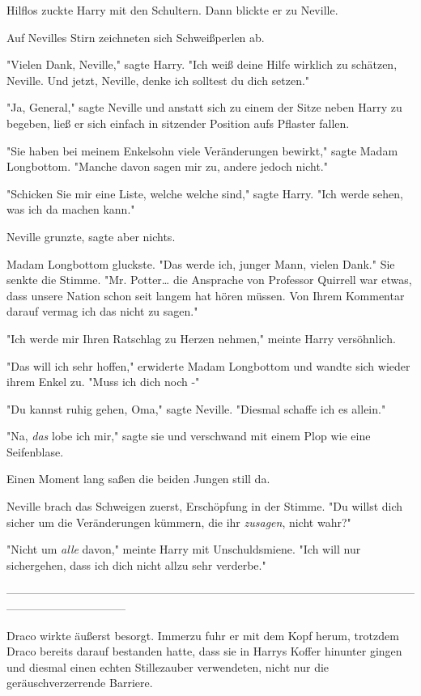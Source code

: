 {Hilflos zuckte Harry mit den Schultern. Dann blickte er zu Neville.

Auf Nevilles Stirn zeichneten sich Schweißperlen ab.

"Vielen Dank, Neville," sagte Harry. "Ich weiß deine Hilfe wirklich zu schätzen, Neville. Und jetzt, Neville, denke ich solltest du dich setzen."

"Ja, General," sagte Neville und anstatt sich zu einem der Sitze neben Harry zu begeben, ließ er sich einfach in sitzender Position aufs Pflaster fallen.

"Sie haben bei meinem Enkelsohn viele Veränderungen bewirkt," sagte Madam Longbottom. "Manche davon sagen mir zu, andere jedoch nicht."

"Schicken Sie mir eine Liste, welche welche sind," sagte Harry. "Ich werde sehen, was ich da machen kann."

Neville grunzte, sagte aber nichts.

Madam Longbottom gluckste. "Das werde ich, junger Mann, vielen Dank." Sie senkte die Stimme. "Mr. Potter… die Ansprache von Professor Quirrell war etwas, dass unsere Nation schon seit langem hat hören müssen. Von Ihrem Kommentar darauf vermag ich das nicht zu sagen."

"Ich werde mir Ihren Ratschlag zu Herzen nehmen," meinte Harry versöhnlich.

"Das will ich sehr hoffen," erwiderte Madam Longbottom und wandte sich wieder ihrem Enkel zu. "Muss ich dich noch -"

"Du kannst ruhig gehen, Oma," sagte Neville. "Diesmal schaffe ich es allein."

"Na, \emph{das} lobe ich mir," sagte sie und verschwand mit einem Plop wie eine Seifenblase.

Einen Moment lang saßen die beiden Jungen still da.

Neville brach das Schweigen zuerst, Erschöpfung in der Stimme. "Du willst dich sicher um die Veränderungen kümmern, die ihr \emph{zusagen}, nicht wahr?"

"Nicht um \emph{alle} davon," meinte Harry mit Unschuldsmiene. "Ich will nur sichergehen, dass ich dich nicht allzu sehr verderbe."

--------------------------------------------------------------------------------------------------------------------------------------------

Draco wirkte äußerst besorgt. Immerzu fuhr er mit dem Kopf herum, trotzdem Draco bereits darauf bestanden hatte, dass sie in Harrys Koffer hinunter gingen und diesmal einen echten Stillezauber verwendeten, nicht nur die geräuschverzerrende Barriere.

}

